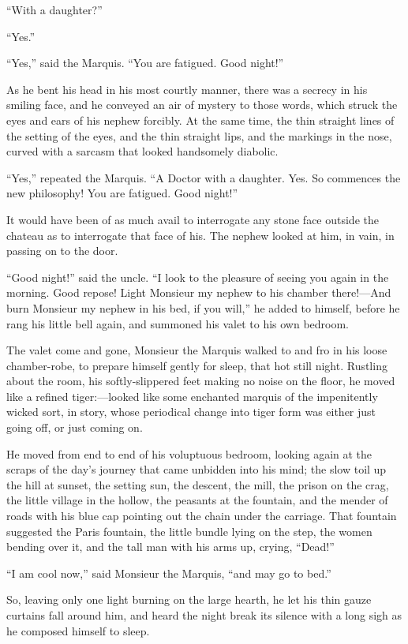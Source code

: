 ``With a daughter?''

``Yes.''

``Yes,'' said the Marquis.  ``You are fatigued.  Good night!''

As he bent his head in his most courtly manner, there was a secrecy
in his smiling face, and he conveyed an air of mystery to those
words, which struck the eyes and ears of his nephew forcibly.  At the
same time, the thin straight lines of the setting of the eyes, and
the thin straight lips, and the markings in the nose, curved with a
sarcasm that looked handsomely diabolic.

``Yes,'' repeated the Marquis.  ``A Doctor with a daughter.  Yes.
So commences the new philosophy!  You are fatigued.  Good night!''

It would have been of as much avail to interrogate any stone face
outside the chateau as to interrogate that face of his.  The nephew
looked at him, in vain, in passing on to the door.

``Good night!'' said the uncle.  ``I look to the pleasure of seeing you
again in the morning.  Good repose!  Light Monsieur my nephew to his
chamber there!---And burn Monsieur my nephew in his bed, if you will,''
he added to himself, before he rang his little bell again, and summoned
his valet to his own bedroom.

The valet come and gone, Monsieur the Marquis walked to and fro in
his loose chamber-robe, to prepare himself gently for sleep, that hot
still night.  Rustling about the room, his softly-slippered feet
making no noise on the floor, he moved like a refined tiger:---looked
like some enchanted marquis of the impenitently wicked sort, in story,
whose periodical change into tiger form was either just going off, or
just coming on.

He moved from end to end of his voluptuous bedroom, looking again at
the scraps of the day's journey that came unbidden into his mind; the
slow toil up the hill at sunset, the setting sun, the descent, the
mill, the prison on the crag, the little village in the hollow, the
peasants at the fountain, and the mender of roads with his blue cap
pointing out the chain under the carriage.  That fountain suggested
the Paris fountain, the little bundle lying on the step, the women
bending over it, and the tall man with his arms up, crying, ``Dead!''

``I am cool now,'' said Monsieur the Marquis, ``and may go to bed.''

So, leaving only one light burning on the large hearth, he let his
thin gauze curtains fall around him, and heard the night break its
silence with a long sigh as he composed himself to sleep.

